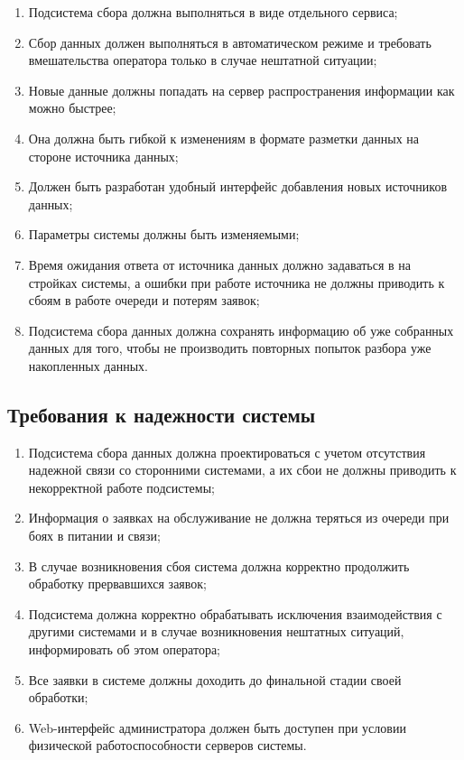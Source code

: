 \begin{enumerate}
 \item Подсистема сбора должна выполняться в виде отдельного сервиса;
 \item Сбор данных должен выполняться в автоматическом режиме и требовать вмешательства оператора только в случае нештатной ситуации;
 \item Новые данные должны попадать на сервер распространения информации как можно быстрее;
 \item Она должна быть гибкой к изменениям в формате разметки данных на стороне источника данных;
 \item Должен быть разработан удобный интерфейс добавления новых источников данных;
 \item Параметры системы должны быть изменяемыми;
 \item Время ожидания ответа от источника данных должно задаваться в на стройках системы, а ошибки при работе источника не должны приводить к сбоям в работе очереди и потерям заявок;
 \item Подсистема сбора данных должна сохранять информацию об уже собранных данных для того, чтобы не производить повторных попыток разбора уже накопленных данных.
\end{enumerate}

\subsection{Требования к надежности системы}

\begin{enumerate}
 \item Подсистема сбора данных должна проектироваться с учетом отсутствия надежной связи со сторонними системами, а их сбои не должны приводить к некорректной работе подсистемы;
 \item Информация о заявках на обслуживание не должна теряться из очереди при боях в питании и связи;
 \item В случае возникновения сбоя система должна корректно продолжить обработку прервавшихся заявок;
 \item Подсистема должна корректно обрабатывать исключения взаимодействия с другими системами и в случае возникновения нештатных ситуаций, информировать об этом оператора; 
 \item Все заявки в системе должны доходить до финальной стадии своей обработки;
 \item Web-интерфейс администратора должен быть доступен при условии физической работоспособности серверов системы.
\end{enumerate}

